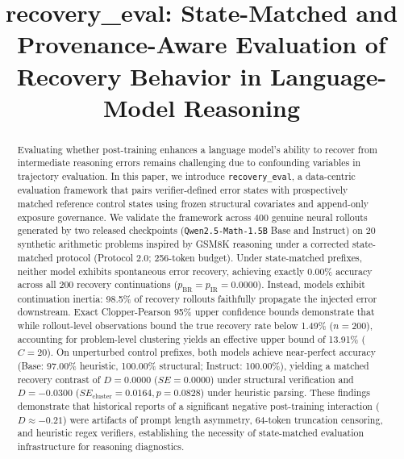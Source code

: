 \documentclass[10pt,conference]{IEEEtran}
\begin{document}
\title{recovery\_eval: State-Matched and Provenance-Aware Evaluation of Recovery Behavior in Language-Model Reasoning}

\author{
}

\maketitle

\begin{abstract}
Evaluating whether post-training enhances a language model's ability to recover from intermediate reasoning errors remains challenging due to confounding variables in trajectory evaluation. In this paper, we introduce \texttt{recovery\_eval}, a data-centric evaluation framework that pairs verifier-defined error states with prospectively matched reference control states using frozen structural covariates and append-only exposure governance. We validate the framework across 400 genuine neural rollouts generated by two released checkpoints (\texttt{Qwen2.5-Math-1.5B} Base and Instruct) on 20 synthetic arithmetic problems inspired by GSM8K reasoning under a corrected state-matched protocol (Protocol 2.0; 256-token budget). Under state-matched prefixes, neither model exhibits spontaneous error recovery, achieving exactly 0.00\% accuracy across all 200 recovery continuations ($p_{\text{BR}} = p_{\text{IR}} = 0.0000$). Instead, models exhibit continuation inertia: 98.5\% of recovery rollouts faithfully propagate the injected error downstream. Exact Clopper-Pearson 95\% upper confidence bounds demonstrate that while rollout-level observations bound the true recovery rate below 1.49\% ($n=200$), accounting for problem-level clustering yields an effective upper bound of 13.91\% ($C=20$). On unperturbed control prefixes, both models achieve near-perfect accuracy (Base: 97.00\% heuristic, 100.00\% structural; Instruct: 100.00\%), yielding a matched recovery contrast of $D = 0.0000$ ($SE = 0.0000$) under structural verification and $D = -0.0300$ ($SE_{\text{cluster}} = 0.0164, p = 0.0828$) under heuristic parsing. These findings demonstrate that historical reports of a significant negative post-training interaction ($D \approx -0.21$) were artifacts of prompt length asymmetry, 64-token truncation censoring, and heuristic regex verifiers, establishing the necessity of state-matched evaluation infrastructure for reasoning diagnostics.
\end{abstract}
\end{document}
